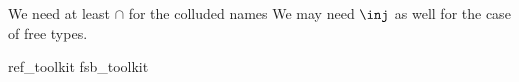 
We need at least $\cap$ for the colluded names
We may need $\inj$ as well for the case of free types.
\begin{zsection}
   \SECTION ref\_toolkit \parents fsb\_toolkit
\end{zsection}

